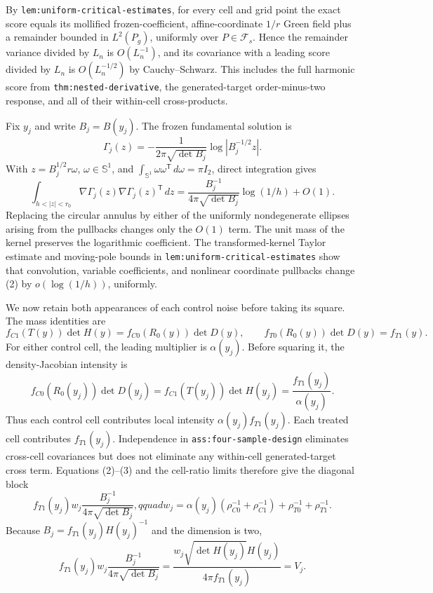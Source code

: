 By \texttt{lem:uniform-critical-estimates}, for every cell and grid point the exact score equals its mollified frozen-coefficient, affine-coordinate \(1/r\) Green field plus a remainder bounded in \(L^2(P_g)\), uniformly over \(P\in\mathcal F_s\).  Hence the remainder variance divided by \(L_n\) is \(O(L_n^{-1})\), and its covariance with a leading score divided by \(L_n\) is \(O(L_n^{-1/2})\) by Cauchy--Schwarz.  This includes the full harmonic score from \texttt{thm:nested-derivative}, the generated-target order-minus-two response, and all of their within-cell cross-products.

Fix \(y_j\) and write \(B_j=B(y_j)\).  The frozen fundamental solution is
\[
 \Gamma_j(z)=-\frac{1}{2\pi\sqrt{\det B_j}}
 \log|B_j^{-1/2}z|.                                                     \tag{1}
\]
With \(z=B_j^{1/2}r\omega\), \(\omega\in\mathbb S^1\), and
\(\int_{\mathbb S^1}\omega\omega^{\mathsf T}\,d\omega=\pi I_2\), direct integration gives
\[
 \int_{h<|z|<r_0}\nabla\Gamma_j(z)\nabla\Gamma_j(z)^{\mathsf T}\,dz
 =\frac{B_j^{-1}}{4\pi\sqrt{\det B_j}}\log(1/h)+O(1).                 \tag{2}
\]
Replacing the circular annulus by either of the uniformly nondegenerate ellipses arising from the pullbacks changes only the \(O(1)\) term.  The unit mass of the kernel preserves the logarithmic coefficient.  The transformed-kernel Taylor estimate and moving-pole bounds in \texttt{lem:uniform-critical-estimates} show that convolution, variable coefficients, and nonlinear coordinate pullbacks change (2) by \(o(\log(1/h))\), uniformly.

We now retain both appearances of each control noise before taking its square.  The mass identities are
\[
 f_{C1}(T(y))\det H(y)=f_{C0}(R_0(y))\det D(y),
 \qquad f_{T0}(R_0(y))\det D(y)=f_{T1}(y).                             \tag{3}
\]
For either control cell, the leading multiplier is \(\alpha(y_j)\).  Before squaring it, the density-Jacobian intensity is
\[
 f_{C0}(R_0(y_j))\det D(y_j)
 =f_{C1}(T(y_j))\det H(y_j)=\frac{f_{T1}(y_j)}{\alpha(y_j)}.
\]
Thus each control cell contributes local intensity \(\alpha(y_j)f_{T1}(y_j)\).  Each treated cell contributes \(f_{T1}(y_j)\).  Independence in \texttt{ass:four-sample-design} eliminates cross-cell covariances but does not eliminate any within-cell generated-target cross term.  Equations (2)--(3) and the cell-ratio limits therefore give the diagonal block
\[
 f_{T1}(y_j)w_j\frac{B_j^{-1}}{4\pi\sqrt{\det B_j}},qquad
 w_j=\alpha(y_j)(\rho_{C0}^{-1}+\rho_{C1}^{-1})
      +\rho_{T0}^{-1}+\rho_{T1}^{-1}.                                  \tag{4}
\]
Because \(B_j=f_{T1}(y_j)H(y_j)^{-1}\) and the dimension is two,
\[
 f_{T1}(y_j)w_j\frac{B_j^{-1}}{4\pi\sqrt{\det B_j}}
 =\frac{w_j\sqrt{\det H(y_j)}H(y_j)}{4\pi f_{T1}(y_j)}=V_j.          \tag{5}
\]

